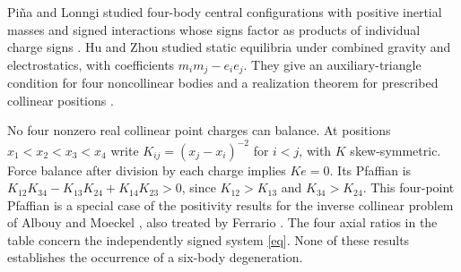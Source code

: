 \documentclass[11pt]{article}
\begin{document}
Pi\~na and Lonngi studied four-body central configurations with positive inertial masses and signed interactions whose signs factor as products of individual charge signs \cite{Pina}. Hu and Zhou studied static equilibria under combined gravity and electrostatics, with coefficients $m_im_j-e_ie_j$. They give an auxiliary-triangle condition for four noncollinear bodies and a realization theorem for prescribed collinear positions \cite[Thms.~1.5, 1.6 and 4.5]{HuZhou}.

No four nonzero real collinear point charges can balance. At positions $x_1<x_2<x_3<x_4$ write $K_{ij}=(x_j-x_i)^{-2}$ for $i<j$, with $K$ skew-symmetric. Force balance after division by each charge implies $Ke=0$. Its Pfaffian is $K_{12} K_{34}-K_{13}K_{24}+K_{14}K_{23}>0$, since $K_{12}>K_{13}$ and $K_{34}>K_{24}$. This four-point Pfaffian is a special case of the positivity results for the inverse collinear problem of Albouy and Moeckel \cite{am}, also treated by Ferrario \cite{Ferrario}. The four axial ratios in the table concern the independently signed system \eqref{eq}. None of these results establishes the occurrence of a six-body degeneration.
\end{document}
